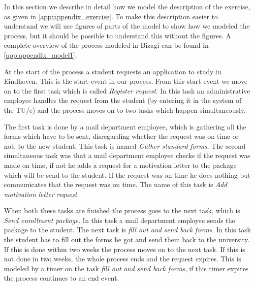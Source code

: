 
In this section we describe in detail how we model the description of the exercise, as given in \autoref{app:appendix_exercise}.
To make this description easier to understand we will use figures of parts of the model to show how we modeled the process, but it should be possible to understand this without the figures.
A complete overview of the process modeled in Bizagi can be found in \autoref{app:appendix_model1}.

At the start of the process a student requests an application to study in Eindhoven.
This is the start event in our process.
From this start event we move on to the first task which is called \emph{Register request}.
In this task an administrative employee handles the request from the student (by entering it in the system of the TU/e) and the process moves on to two tasks which happen simultaneously.

The first task is done by a mail department employee, which is gathering all the forms which have to be sent, disregarding whether the request was on time or not, to the new student.
This task is named \emph{Gather standard forms}.
The second simultaneous task was that a mail department employee checks if the request was made on time, if not he adds a request for a motivation letter to the package which will be send to the student.
If the request was on time he does nothing but communicates that the request was on time.
The name of this task is \emph{Add motivation letter request}.

When both these tasks are finished the process goes to the next task, which is \emph{Send enrollment package}.
In this task a mail department employee sends the package to the student.
The next task is \emph{fill out and send back forms}.
In this task the student has to fill out the forms he got and send them back to the university.
If this is done within two weeks the process moves on to the next task.
If this is not done in two weeks, the whole process ends and the request expires.
This is modeled by a timer on the task \emph{fill out and send back forms}, if this timer expires the process continues to an end event.

